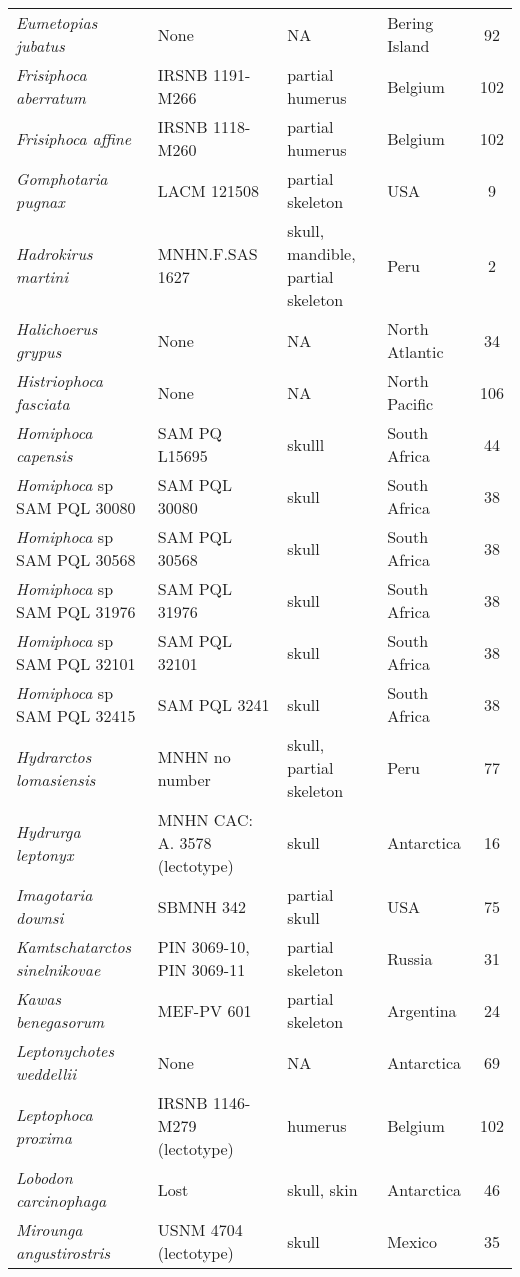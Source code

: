 \begin{longtable}{p{}p{}p{}lc}
\textit{Eumetopias jubatus} &	None & 	NA & 	Bering Island & 92\\
\textit{Frisiphoca aberratum} &	IRSNB 1191-M266 & 	partial humerus & 	Belgium & 102\\
\textit{Frisiphoca affine} &	IRSNB 1118-M260 & 	partial humerus & 	Belgium & 102\\
\textit{Gomphotaria pugnax} &	LACM 121508 & 	partial skeleton & 	USA & 9\\
\textit{Hadrokirus martini} &	MNHN.F.SAS 1627 & 	skull, mandible, partial skeleton & 	Peru & 2\\
\textit{Halichoerus grypus} &	None & 	NA & 	North Atlantic & 34\\
\textit{Histriophoca fasciata} &	None & 	NA & 	North Pacific & 106\\
\textit{Homiphoca capensis} &	SAM PQ L15695 & 	skulll & 	South Africa & 44\\
\textit{Homiphoca} sp SAM PQL 30080	& SAM PQL 30080 & 	skull & 	South Africa & 38\\
\textit{Homiphoca} sp SAM PQL 30568	& SAM PQL 30568 & 	skull & 	South Africa & 38\\
\textit{Homiphoca} sp SAM PQL 31976	& SAM PQL 31976 & 	skull & 	South Africa & 38\\
\textit{Homiphoca} sp SAM PQL 32101	& SAM PQL 32101 & 	skull & 	South Africa & 38\\
\textit{Homiphoca} sp SAM PQL 32415	& SAM PQL 3241 & 	skull & 	South Africa & 38\\
\textit{Hydrarctos lomasiensis} &	MNHN no number & 	skull, partial skeleton & 	Peru & 77\\
\textit{Hydrurga leptonyx} &	MNHN CAC: A. 3578 (lectotype) & 	skull & 	Antarctica & 16\\
\textit{Imagotaria downsi} &	SBMNH 342 & 	partial skull & 	USA & 75\\
\textit{Kamtschatarctos sinelnikovae} &	PIN 3069-10, PIN 3069-11 & 	partial skeleton & 	Russia & 31\\
\textit{Kawas benegasorum} &	MEF-PV 601 & 	partial skeleton & 	Argentina & 24\\
\textit{Leptonychotes weddellii} &	None & 	NA & 	Antarctica & 69\\
\textit{Leptophoca proxima} &	IRSNB 1146-M279 (lectotype) & 	humerus & 	Belgium & 102\\
\textit{Lobodon carcinophaga} &	Lost & 	skull, skin & 	Antarctica & 46\\
\textit{Mirounga angustirostris} &	USNM 4704 (lectotype) & 	skull & 	Mexico & 35\\

\end{longtable}
